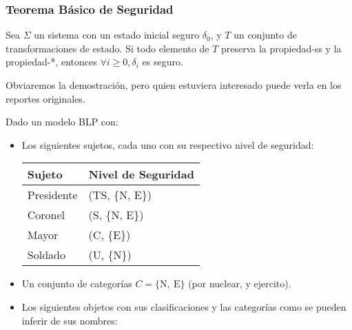 \documentclass[main.tex]{subfiles}
\begin{document}
\subsubsection*{Teorema Básico de Seguridad}
Sea $\Sigma$ un sistema con un estado
inicial seguro $\delta_0$, y $T$ un conjunto de transformaciones de estado. Si
todo elemento de $T$ preserva la propiedad-ss y la propiedad-*, entonces
$\forall i \geq 0, \delta_i$ es seguro.\vspace{.2cm}

Obviaremos la demostración, pero quien estuviera interesado puede verla en los
reportes originales.

\begin{exercise}
Dado un modelo BLP con:
\begin{itemize}
\itemsep0em 
  \item Los siguientes sujetos, cada uno con su respectivo nivel de seguridad:

    \begin{tabular}{l|l}
      Sujeto & Nivel de Seguridad \\
      \hline
      Presidente & (TS, \{N, E\})\\
      Coronel    & (S, \{N, E\})\\
      Mayor      & (C, \{E\})\\
      Soldado    & (U, \{N\})
    \end{tabular}
  \item Un conjunto de categorías $C = \{\text{N},~\text{E}\}$ (por nuclear, y ejercito).
  \item Los siguientes objetos con sus clasificaciones y las categorías como se pueden inferir de sus nombres:


\end{itemize}
\end{exercise}
\end{document}
